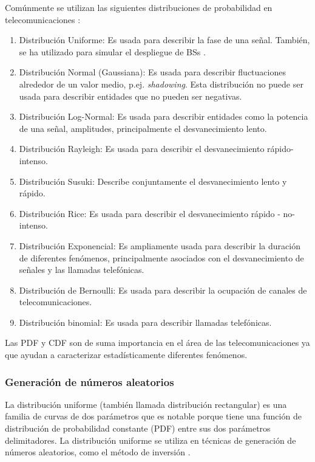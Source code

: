Comúnmente se utilizan las siguientes distribuciones de probabilidad en telecomunicaciones \parencite{Correia2018}:

\begin{enumerate}
    \item Distribución Uniforme: Es usada para describir la fase de una señal. También, se ha utilizado para simular el despliegue de BSs \parencite{TurjmanSmallCells}.
    \item Distribución Normal (Gaussiana): Es usada para describir fluctuaciones alrededor de un valor medio, p.ej. \textit{shadowing}. Esta distribución no puede ser usada para describir entidades que no pueden ser negativas.
    \item Distribución Log-Normal: Es usada para describir entidades como la potencia de una señal, amplitudes, principalmente el desvanecimiento lento.
    \item Distribución Rayleigh: Es usada para describir el desvanecimiento rápido-intenso.
    \item Distribución Susuki: Describe conjuntamente el desvanecimiento lento y rápido.
    \item Distribución Rice: Es usada para describir el desvanecimiento rápido - no-intenso.
    \item Distribución Exponencial: Es ampliamente usada para describir la duración de diferentes fenómenos, principalmente asociados con el desvanecimiento de señales y las llamadas telefónicas.
    \item Distribución de Bernoulli: Es usada para describir la ocupación de canales de telecomunicaciones.
    \item Distribución binomial: Es usada para describir llamadas telefónicas.
\end{enumerate}

Las PDF y CDF son de suma importancia en el área de las telecomunicaciones ya que ayudan a caracterizar estadísticamente diferentes fenómenos.\newline

\subsubsection{Generación de números aleatorios}

La distribución uniforme (también llamada distribución rectangular) es una familia de curvas de dos parámetros que es notable porque tiene una función de distribución de probabilidad constante (PDF) entre sus dos parámetros delimitadores. La distribución uniforme se utiliza en técnicas de generación de números aleatorios, como el método de inversión \parencite{ UniformMatlab}.\newline

